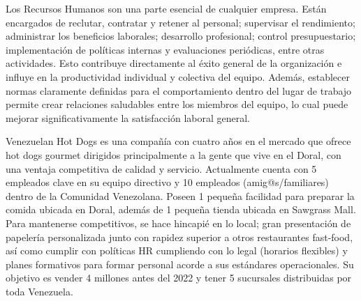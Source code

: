 
                Los Recursos Humanos son una parte esencial de cualquier empresa. Están encargados de reclutar, contratar y retener al personal; supervisar el rendimiento; administrar los beneficios laborales; desarrollo profesional; control presupuestario; implementación de políticas internas y evaluaciones periódicas, entre otras actividades. Esto contribuye directamente al éxito general de la organización e influye en la productividad individual y colectiva del equipo. Además, establecer normas claramente definidas para el comportamiento dentro del lugar de trabajo permite crear relaciones saludables entre los miembros del equipo, lo cual puede mejorar significativamente la satisfacción laboral general.

                Venezuelan Hot Dogs es una compañía con cuatro años en el mercado que ofrece hot dogs gourmet dirigidos principalmente a la gente que vive en el Doral, con una ventaja competitiva de calidad y servicio. Actualmente cuenta con 5 empleados clave en su equipo directivo y 10 empleados (amig@s/familiares) dentro de la Comunidad Venezolana. Poseen 1 pequeña facilidad para preparar la comida ubicada en Doral, además de 1 pequeña tienda ubicada en Sawgrass Mall. Para mantenerse competitivos, se hace hincapié en lo local; gran presentación de papelería personalizada junto con rapidez superior a otros restaurantes fast-food, así como cumplir con políticas HR cumpliendo con lo legal (horarios flexibles) y planes formativos para formar personal acorde a sus estándares operacionales. Su objetivo es vender 4 millones antes del 2022 y tener 5 sucursales distribuidas por toda Venezuela.
